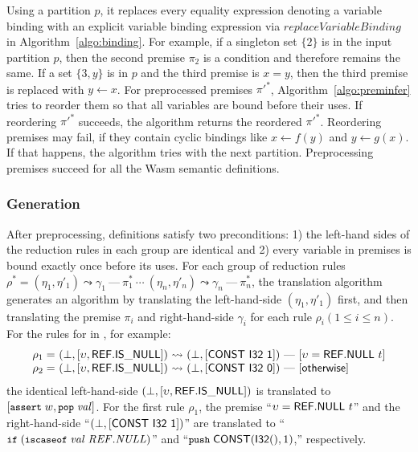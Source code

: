 Using a partition $p$, it replaces every equality expression denoting a variable binding
with an explicit variable binding expression via $\mathit{replaceVariableBinding}$ in Algorithm~\ref{algo:binding}.
For example, if a singleton set $\{2\}$ is in the input partition $p$,
then the second premise $\pi_2$ is a condition and therefore remains the same.
If a set $\{3, y\}$ is in $p$ and the third premise is $x = y$,
then the third premise is replaced with $y \leftarrow x$.
For preprocessed premises $\pi'^*$, Algorithm~\ref{algo:preminfer} tries to reorder them
so that all variables are bound before their uses.
If reordering $\pi'^*$ succeeds, the algorithm returns the reordered $\pi'^*$.
Reordering premises may fail, if they contain cyclic bindings like $x \leftarrow f(y)$ and $y \leftarrow g(x)$.
If that happens, the algorithm tries with the next partition.
Preprocessing premises succeed for all the Wasm semantic definitions.

\subsubsection{\al Generation}
After preprocessing, \dl definitions satisfy two preconditions:
1) the left-hand sides of the reduction rules in each group
are identical and 2) every variable in premises is bound exactly once before its uses.
For each group of reduction rules $\rho^* =
(\eta_1, \eta' _1)  \leadsto \gamma_1\ \mbox{---}\ \pi_1^*\
\cdots\
(\eta_n, \eta' _n) \leadsto \gamma_n\ \mbox{---}\ \pi_n^*$,
the translation algorithm \dltoil generates an \al algorithm
by translating the left-hand-side $(\eta_1, \eta' _1)$ first,
and then translating the premise $\pi_i$ and right-hand-side $\gamma_i$
for each rule $\rho_i (1\le i\le n)$.
For the rules for \inblue{\ensuremath{\mathsf{ref.is\_null}}} in \dl, for example:
\[
\begin{array}{l@{~}l@{~}c@{~}l}
\rho_1 = &(\bot, [\upsilon, \ssf{REF.IS\_NULL}]) &\leadsto& (\bot, [\ssf{CONST\ I32\ 1}])\
\mbox{---}\ [\upsilon = \ssf{REF.NULL}\ t]\\
\rho_2 = &(\bot, [\upsilon, \ssf{REF.IS\_NULL}])&\leadsto&(\bot, [\ssf{CONST\ I32\ 0}])\
\mbox{---}\ [\ssf{\small otherwise}]
\end{array}
\]
the identical left-hand-side $(\bot, [\upsilon, \mathsf{REF.IS\_NULL}])$
is translated to $[\texttt{\small assert} \; w, \texttt{\small pop} \; \mathit{val}]$.
For the first rule $\rho_1$, the premise ``$\upsilon = \ssf{REF.NULL}\ t$'' and
the right-hand-side ``$(\bot, [\mathsf{CONST\ I32\ 1}])$'' are translated to
``$\texttt{\small if} \; (\texttt{\small iscaseof} \; \mathit{val} \; \mathit{REF.NULL})$'' and
``$\texttt{\small push} \; \mathsf{CONST}(\mathsf{I32}(), 1)$,'' respectively.

